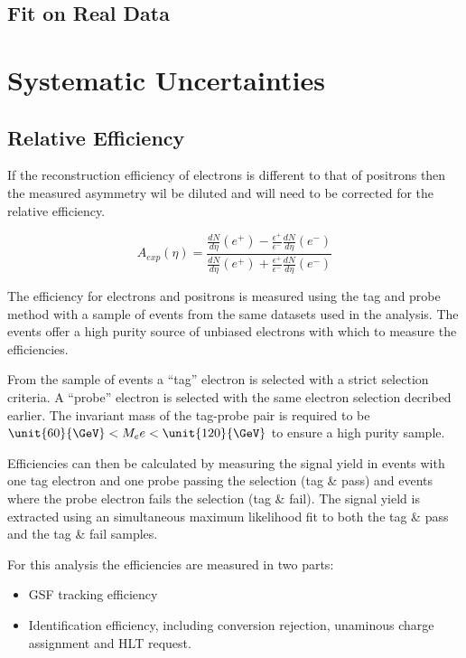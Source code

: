 \subsection{Fit on Real Data}

\section{Systematic Uncertainties}
\subsection{Relative Efficiency}

If the reconstruction efficiency of electrons is different to that of positrons
then the measured asymmetry wil be diluted and will need to be corrected for
the relative efficiency.

\begin{equation}
A_{exp}(\eta) = \frac{
                    \frac{dN}{d\eta}(e^+)-
                    \frac{\epsilon^+}{\epsilon^-}\frac{dN}{d\eta}(e^-)
                }
                {
                    \frac{dN}{d\eta}(e^+)+
                    \frac{\epsilon^+}{\epsilon^-}\frac{dN}{d\eta}(e^-)
                }
\end{equation}

The efficiency for electrons and positrons is measured using the tag and probe
method %
with a sample of \Zee events from the same datasets used in the analysis. 
The \Zee events offer a high purity source of unbiased electrons with which to
measure the efficiencies.

From the sample of \Zee events a ``tag'' electron is selected with a strict
selection criteria. 
A ``probe'' electron is selected with the same electron selection decribed
earlier.
The invariant mass of the tag-probe pair is required to be
$\unit{60}{\GeV} < M_ee < \unit{120}{\GeV}$ to ensure a high purity sample.

Efficiencies can then be calculated by measuring the signal yield in events
with one tag electron and one probe passing the selection (tag \& pass) and
events where the probe electron fails the selection (tag \& fail).
The signal yield is extracted using an simultaneous maximum likelihood fit to
both the tag \& pass and the tag \& fail samples.

For this analysis the efficiencies are measured in two parts:

\begin{itemize}
    \item GSF tracking efficiency
    \item Identification efficiency, including conversion rejection, unaminous
charge assignment and HLT request.
\end{itemize}


